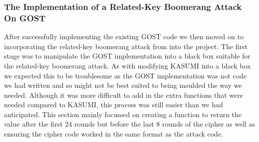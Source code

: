 \documentclass[10pt,journal,compsoc]{IEEEtran}
\begin{document}
\subsubsection{The Implementation of a Related-Key Boomerang Attack On GOST}
After successfully implementing the existing GOST code we then moved on to incorporating the related-key boomerang attack from \cite{cryptoeprint:2010/111} into the project. The first stage was to manipulate the GOST implementation into a black box suitable for the related-key boomerang attack. As with modifying KASUMI into a black box we expected this to be troublesome as the GOST implementation was not code we had written and so might not be best suited to being moulded the way we needed. Although it was more difficult to add in the extra functions that were needed compared to KASUMI, this process was still easier than we had anticipated. This section mainly focussed on creating a function to return the value after the first 24 rounds but before the last 8 rounds of the cipher as well as ensuring the cipher code worked in the same format as the attack code.
\end{document}
